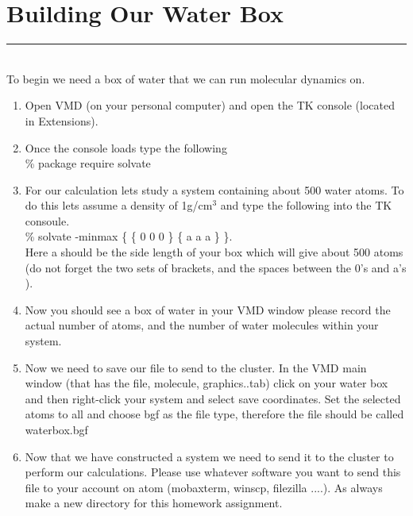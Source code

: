 \documentclass{article}
\begin{document}
\section{Building Our Water Box}
\noindent\rule[0.5ex]{\linewidth}{1pt}\\

To begin we need a box of water that we can run molecular dynamics on. 
\begin{enumerate}

    \item Open VMD (on your personal computer) and open the TK console (located in Extensions). \\
   
    \item Once the console loads type the following\\
\% package require solvate \\

\item For our calculation lets study a system containing about 500 water atoms.
To do this lets assume a density of 1g/cm$^3$ and type the following into the TK consoule.\\
\% solvate -minmax \{ \{ 0 0 0 \} \{ a a a \} \}.\\
Here a should be the side length of your box which will give about 500 atoms (do not forget the two sets of brackets, and the spaces between the 0's and a's ). \\

\item Now you should see a box of water in your VMD window please record the actual number of atoms, and the number of water molecules within your system.\\

\item Now we need to save our file to send to the cluster.
In the VMD main window (that has the file, molecule, graphics..tab) click on your water box and then right-click your system and select save coordinates. 
Set the selected atoms to all and choose bgf as the file type, therefore the file should be called waterbox.bgf \\

\item Now that we have constructed a system we need to send it to the cluster to perform our calculations. 
Please use whatever software you want to send this file to your account on atom (mobaxterm, winscp, filezilla ....). 
As always make a new directory for this homework assignment. \\


\end{enumerate}
\end{document}
